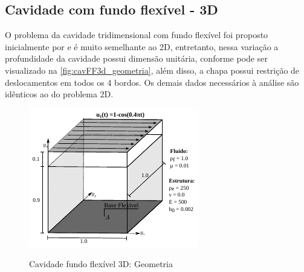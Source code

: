 \begin{figure}[!htbp]
	\label{fig:cavFF2d_press}
\end{figure}

\subsection{Cavidade com fundo flexível - 3D}

O problema da cavidade tridimensional com fundo flexível foi proposto inicialmente por  e é muito semelhante ao 2D, entretanto, nessa variação a profundidade da cavidade possui dimensão unitária, conforme pode ser visualizado na \autoref{fig:cavFF3d_geometria}, além disso, a chapa possui restrição de deslocamentos em todos os 4 bordos. Os demais dados necessários à análise são idênticos ao do problema 2D.

\begin{figure}[!htbp]
	\caption{Cavidade fundo flexível 3D: Geometria}
	\centering 
	\includegraphics[scale=2.0,trim=0cm 0cm 0cm 0cm, clip=true]{Imagens/Cap7/cavFF3d_geometria.pdf}	
	\label{fig:cavFF3d_geometria}
\end{figure}

